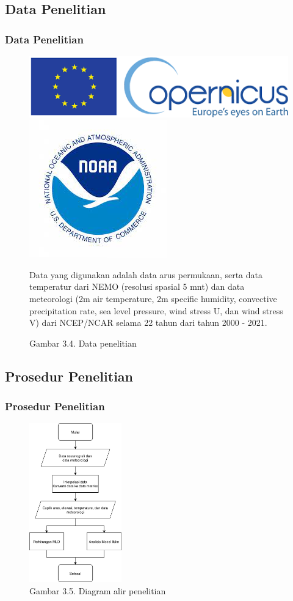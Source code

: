 \documentclass{beamer}
\begin{document}
\subsection{Data Penelitian}
\begin{frame}
	\frametitle{Data Penelitian}
	\begin{figure}[H]
		\centering
		\includegraphics[width=.5\textwidth]{logo_cmmes.png}
		\\[\smallskipamount]
		\includegraphics[width=.24\textwidth]{logo_ncep.jpeg}
		\captionsetup{labelformat=empty}
		\caption{Gambar 3.4. Data penelitian}
		\label{fig:data}
		\tiny
		Data yang digunakan adalah data arus permukaan, serta data temperatur dari NEMO (resolusi spasial 5 mnt) dan data meteorologi (2m air temperature, 2m specific
		humidity, convective precipitation rate, sea level pressure, wind stress U, dan wind
		stress V) dari NCEP/NCAR selama 22 tahun dari tahun 2000 - 2021. 
	\end{figure}
\end{frame}

\subsection{Prosedur Penelitian}
\begin{frame}
	\frametitle{Prosedur Penelitian}
		\begin{figure}[H]
			\centering
			\includegraphics[width=4cm]{flowchart.png}
			\captionsetup{labelformat=empty}
			\caption{Gambar 3.5. Diagram alir penelitian}
			\label{fig:flowchart}
		\end{figure}
\end{frame}
\end{document}
